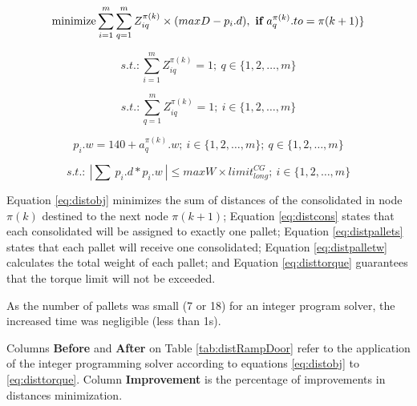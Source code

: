 \documentclass[preprint,authoryear]{elsarticle}
\begin{document}
\begin{equation} \label{eq:distobj}
	\mbox{minimize} \sum_{i=1}^{m} \sum_{q=1}^{m} Z^{\pi(k)}_{iq} \times ( maxD - p_i.d) ,\ \mbox{{\bf if}}\ a^{\pi(k)}_q.to = \pi(k+1) \}
\end{equation}

\begin{equation} \label{eq:distcons}
	s.t.: \sum_{i=1}^{m} Z^{\pi(k)}_{iq} = 1;\ q \in \{1,2,\ldots,m\}
\end{equation}

\begin{equation} \label{eq:distpallets}
	s.t.: \sum_{q=1}^{m} Z^{\pi(k)}_{iq}=1;\ i \in \{1,2,\ldots,m\}
\end{equation}

\begin{equation} \label{eq:distpalletw}
	p_i.w = 140 + a^{\pi(k)}_q.w ;\ i \in \{1,2,\ldots,m\};\ q \in \{1,2,\ldots,m\}
\end{equation}

\begin{equation} \label{eq:disttorque}
	s.t.:\ | \sum\ p_i.d * p_i.w\ | \leq maxW \times limit^{CG}_{long} ;\ i \in \{1,2,\ldots,m\}
\end{equation}

Equation \ref{eq:distobj} minimizes the sum of distances of the consolidated in node $\pi(k)$ destined to the next node $\pi(k+1)$; Equation \ref{eq:distcons} states that each consolidated will be assigned to exactly one pallet; Equation \ref{eq:distpallets} states that each pallet will receive one consolidated; Equation \ref{eq:distpalletw} calculates the total weight of each pallet; and Equation \ref{eq:disttorque} guarantees that the torque limit will not be exceeded. 

As the number of pallets was small (7 or 18) for an integer program solver, the increased time was negligible (less than 1s).

Columns {\bf Before} and {\bf After} on Table \ref{tab:distRampDoor} refer to the application of the integer programming solver according to equations \ref{eq:distobj} to \ref{eq:disttorque}. Column {\bf Improvement} is the percentage of improvements in distances minimization.


\vspace{2.0mm}
\end{document}
